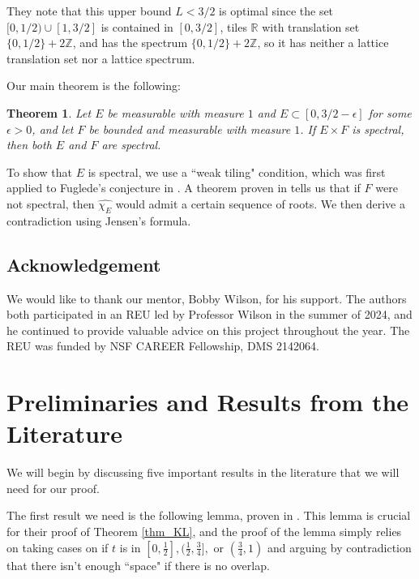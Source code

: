 \documentclass{amsart}
\newtheorem{theorem}{Theorem}[section]
\begin{document}
They note that this upper bound $L < 3/2$ is optimal since the set $[0,1/2) \cup [1,3/2]$ is contained in $[0,3/2]$, tiles $\mathbb{R}$ with translation set $\{0,1/2\} + 2\mathbb{Z}$, and has the spectrum $\{0,1/2\} + 2\mathbb{Z}$, so it has neither a lattice translation set nor a lattice spectrum. 

Our main theorem is the following:

\begin{theorem}
Let $E$ be measurable with measure $1$ and $E\subset[0,3/2-\epsilon]$ for some $\epsilon > 0$, and let $F$ be bounded and measurable with measure $1$. If $E \times F$ is spectral, then both $E$ and $F$ are spectral.
\label{thm_main}
\end{theorem} 

To show that $E$ is spectral, we use a ``weak tiling" condition, which was first applied to Fuglede's conjecture in \cite{LM22}. A theorem proven in \cite{K16} tells us that if $F$ were not spectral, then $\hat{\chi_E}$ would admit a certain sequence of roots. We then derive a contradiction using Jensen's formula.

\subsection*{Acknowledgement}

We would like to thank our mentor, Bobby Wilson, for his support. The authors both participated in an REU led by Professor Wilson in the summer of 2024, and he continued to provide valuable advice on this project throughout the year. The REU was funded by NSF CAREER Fellowship, DMS 2142064.


\section{Preliminaries and Results from the Literature}

We will begin by discussing five important results in the literature that we will need for our proof. 

The first result we need is the following lemma, proven in \cite{KL02}. This lemma is crucial for their proof of Theorem \ref{thm_KL}, and the proof of the lemma simply relies on taking cases on if $t$ is in $[0, \frac12], (\frac12, \frac34], $ or $(\frac34, 1)$ and arguing by contradiction that there isn't enough ``space" if there is no overlap.
\end{document}
